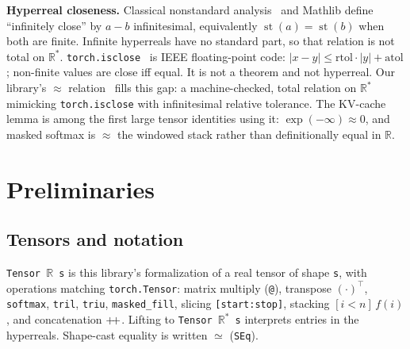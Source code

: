 \documentclass[11pt,a4paper]{article}
\newcommand{\concat}{\mathbin{+\mkern-4mu+}}
\newcommand{\XEq}{\approx}
\newcommand{\SEq}{\simeq}
\newcommand{\Rstar}{\mathbb{R}^*}
\begin{document}
\textbf{Hyperreal closeness.}
Classical nonstandard analysis~\cite{keisler1976elementary} and Mathlib define ``infinitely close'' by $a-b$ infinitesimal, equivalently $\operatorname{st}(a)=\operatorname{st}(b)$ when both are finite.
Infinite hyperreals have no standard part, so that relation is not total on $\Rstar$.
\texttt{torch.isclose}~\cite{pytorch_isclose} is IEEE floating-point code: $|x-y|\le \mathrm{rtol}\cdot|y|+\mathrm{atol}$; non-finite values are close iff equal.
It is not a theorem and not hyperreal.
Our library's $\XEq$ relation~\cite{lemma_xeq} fills this gap: a machine-checked, total relation on $\Rstar$ mimicking \texttt{torch.isclose} with infinitesimal relative tolerance.
The KV-cache lemma is among the first large tensor identities using it: $\exp(-\infty)\XEq 0$, and masked softmax is $\XEq$ the windowed stack rather than definitionally equal in $\mathbb{R}$.

\section{Preliminaries}
\label{sec:prelim}

\subsection{Tensors and notation}

\texttt{Tensor $\mathbb{R}$ s} is this library's formalization of a real tensor of shape \texttt{s}, with operations matching \texttt{torch.Tensor}: matrix multiply (\texttt{@}), transpose $(\cdot)^{\top}$, \texttt{softmax}, \texttt{tril}, \texttt{triu}, \texttt{masked\_fill}, slicing \texttt{[start:stop]}, stacking $[i<n]\,f(i)$, and concatenation $\concat$.
Lifting to \texttt{Tensor $\Rstar$ s} interprets entries in the hyperreals.
Shape-cast equality is written $\SEq$ (\texttt{SEq}).
\end{document}
